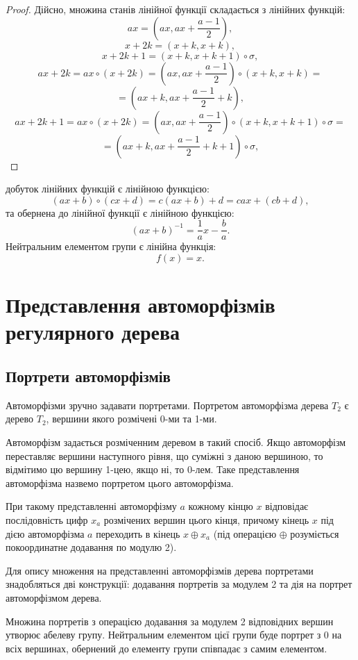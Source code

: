 \documentclass[a4paper,12pt]{article} \usepackage{a4wide}
\numberwithin{equation}{subsection}
\begin{document}
\begin{proof}
Дійсно, множина станів лінійної функції складається з лінійних функцій:
$$ax=(ax,ax+\frac{a-1}{2}),$$
$$x+2k=(x+k,x+k),$$
$$x+2k+1=(x+k,x+k+1)\circ \sigma,$$
$$ax+2k=ax\circ (x+2k)=(ax,ax+\frac{a-1}{2})\circ (x+k,x+k)=$$ $$=(ax+k,ax+\frac{a-1}{2}+k),$$
$$ax+2k+1=ax\circ (x+2k)=(ax,ax+\frac{a-1}{2})\circ (x+k,x+k+1)\circ \sigma=$$ $$=(ax+k,ax+\frac{a-1}{2}+k+1)\circ \sigma,$$
\end{proof}
добуток лінійних функцій є лінійною функцією:
$$(ax+b)\circ (cx+d)=c(ax+b)+d=cax+(cb+d),$$
та обернена до лінійної функції є лінійною функцією:
$$(ax+b)^{-1}=\frac{1}{a}x-\frac{b}{a}.$$
Нейтральним елементом групи є лінійна функція:
$$f(x)=x.$$
\section{Представлення автоморфізмів регулярного дерева}

\subsection{Портрети автоморфізмів}

 Автоморфізми зручно задавати портретами. Портретом автоморфізма дерева $T_2$ є дерево $T_2$, вершини якого розмічені 0-ми та 1-ми.

 Автоморфізм задається розміченним деревом в такий спосіб. Якщо автоморфізм переставляє вершини наступного рівня, що суміжні з даною вершиною, то відмітимо цю вершину 1-цею, якщо ні, то 0-лем. Таке представлення автоморфізма назвемо портретом цього автоморфізма.

 При такому представленні автоморфізму $a$ кожному
  кінцю $x$ відповідає послідовність цифр $x_a$ розмічених вершин
   цього кінця, причому кінець
 $x$ під дією автоморфізма $a$ переходить в кінець $x\oplus x_a$
  (під операцією $\oplus$ розуміється покоординатне додавання по модулю 2).


Для опису множення на представленні автоморфізмів дерева портретами знадобляться дві конструкції: додавання портретів за модулем 2 та дія на портрет автоморфізмом дерева.

Множина портретів з операцією додавання за модулем 2 відповідних вершин утворює абелеву групу. Нейтральним елементом цієї групи буде портрет з 0 на всіх вершинах, обернений до елементу групи співпадає з самим елементом.
\end{document}
